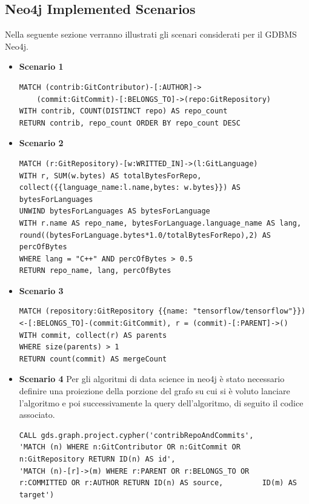 \documentclass[11pt]{article}
\begin{document}
\subsection{Neo4j Implemented Scenarios}
Nella seguente sezione verranno illustrati gli scenari considerati per il GDBMS Neo4j. 
\begin{itemize}
    \item \textbf{Scenario 1}
\begin{lstlisting}[style = all, style = CypherStyle] 
MATCH (contrib:GitContributor)-[:AUTHOR]->
    (commit:GitCommit)-[:BELONGS_TO]->(repo:GitRepository) 
WITH contrib, COUNT(DISTINCT repo) AS repo_count
RETURN contrib, repo_count ORDER BY repo_count DESC
\end{lstlisting}

    \item \textbf{Scenario 2}
\begin{lstlisting}[style = all, style = CypherStyle] 
MATCH (r:GitRepository)-[w:WRITTED_IN]->(l:GitLanguage)
WITH r, SUM(w.bytes) AS totalBytesForRepo, collect({{language_name:l.name,bytes: w.bytes}}) AS bytesForLanguages
UNWIND bytesForLanguages AS bytesForLanguage
WITH r.name AS repo_name, bytesForLanguage.language_name AS lang, round((bytesForLanguage.bytes*1.0/totalBytesForRepo),2) AS percOfBytes
WHERE lang = "C++" AND percOfBytes > 0.5
RETURN repo_name, lang, percOfBytes 
\end{lstlisting}

    \item \textbf{Scenario 3}
\begin{lstlisting}[style = all, style = CypherStyle] 
MATCH (repository:GitRepository {{name: "tensorflow/tensorflow"}})<-[:BELONGS_TO]-(commit:GitCommit), r = (commit)-[:PARENT]->()
WITH commit, collect(r) AS parents
WHERE size(parents) > 1
RETURN count(commit) AS mergeCount
\end{lstlisting}
    
    \item \textbf{Scenario 4}
    \newline Per gli algoritmi di data science in neo4j è stato necessario definire una proiezione della porzione del grafo su cui si è voluto lanciare l'algoritmo e poi successivamente la query dell'algoritmo, di seguito il codice associato.

\begin{lstlisting}[style = all, style = CypherStyle] 
CALL gds.graph.project.cypher('contribRepoAndCommits',
'MATCH (n) WHERE n:GitContributor OR n:GitCommit OR         n:GitRepository RETURN ID(n) AS id',
'MATCH (n)-[r]->(m) WHERE r:PARENT OR r:BELONGS_TO OR       r:COMMITTED OR r:AUTHOR RETURN ID(n) AS source,         ID(m) AS target')
\end{lstlisting}


\end{itemize}
\end{document}
